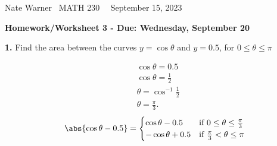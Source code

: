 \documentclass{report}
\title{\Huge{}}
\author{\huge{Nathan Warner}}
\date{\huge{}}
\begin{document}
    \pagebreak \bigbreak \noindent
    Nate Warner \ \quad \quad \quad \quad \quad \quad \quad \quad \quad \quad \quad \quad \quad \quad \quad \quad \quad  MATH 230 \quad  \quad \quad \quad \quad \quad \quad \quad \quad \ \ \quad \quad September 15, 2023
    \begin{center}
        \textbf{Homework/Worksheet 3 - Due: Wednesday, September 20}
    \end{center}
    \bigbreak \noindent 
    \begin{mdframed}
        \textbf{1.} Find the area between the curves $y=\cos{\theta}$ and $y = 0.5$, for $0 \leq \theta \leq \pi$
    \end{mdframed}
    \bigbreak \noindent 
    \begin{minipage}[]{0.47\textwidth}
     \begin{align*}
         &\cos{\theta } = 0.5 \\
         &\cos{\theta} = \frac{1}{2} \\
         &\theta = \cos^{-1}{\frac{1}{2}} \\
         &\theta = \frac{\pi}{3}
     .\end{align*}
      \begin{equation}
        \abs{\cos{\theta } - 0.5} = 
        \begin{cases}
                 \cos{\theta} - 0.5 & \text{if } 0 \leq \theta \leq \frac{\pi}{3} \\
                 -\cos{\theta} + 0.5 & \text{if } \frac{\pi}{3} < \theta \leq \pi
            \end{cases}
        \end{equation}
    \end{minipage}
\end{document}
